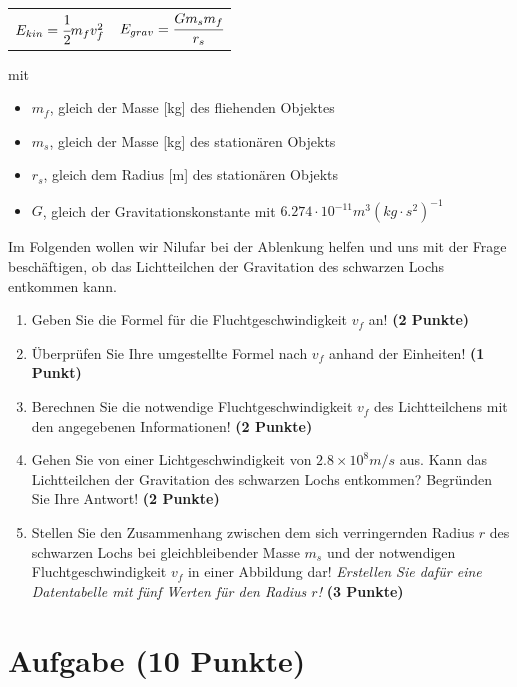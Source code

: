 \documentclass[a4paper, 9pt]{scrartcl}\usepackage[]{graphicx}\usepackage[]{xcolor}
\begin{document}
\begin{center}
  \begin{tabular}{cc}
    $E_{kin} = \cfrac{1}{2}m_fv_f^2$ & $E_{grav} = \cfrac{Gm_sm_f}{r_s}$\\
  \end{tabular}
\end{center}

mit

\begin{itemize}[noitemsep]
\item $m_f$, gleich der Masse [kg] des fliehenden Objektes
\item $m_s$, gleich der Masse [kg] des stationären Objekts
\item $r_s$, gleich dem Radius [m] des stationären Objekts  
\item $G$, gleich der Gravitationskonstante mit $6.274 \cdot 10^{-11} m^3(kg \cdot s^2)^{-1}$ 
\end{itemize}

Im Folgenden wollen wir Nilufar bei der Ablenkung helfen und uns mit der Frage beschäftigen, ob das Lichtteilchen der Gravitation des schwarzen Lochs entkommen kann.

\begin{enumerate}
\item Geben Sie die Formel für die Fluchtgeschwindigkeit $v_f$ an! \textbf{(2 Punkte)}
\item Überprüfen Sie Ihre umgestellte Formel nach $v_f$ anhand der Einheiten! \textbf{(1 Punkt)} 
\item Berechnen Sie die notwendige Fluchtgeschwindigkeit $v_f$ des Lichtteilchens mit den angegebenen Informationen! \textbf{(2 Punkte)}
\item Gehen Sie von einer Lichtgeschwindigkeit von $\ensuremath{2.8\times 10^{8}}m/s$ aus. Kann das Lichtteilchen der Gravitation des schwarzen Lochs entkommen? Begründen Sie Ihre Antwort! \textbf{(2 Punkte)}
\item Stellen Sie den Zusammenhang zwischen dem sich verringernden Radius $r$ des schwarzen Lochs bei gleichbleibender Masse $m_s$ und der notwendigen Fluchtgeschwindigkeit $v_f$ in einer Abbildung dar! \textit{Erstellen Sie dafür eine Datentabelle mit fünf Werten für den Radius $r$!} \textbf{(3 Punkte)}
\end{enumerate}

 
\clearpage

\section{Aufgabe \hfill (10 Punkte)}
\end{document}
